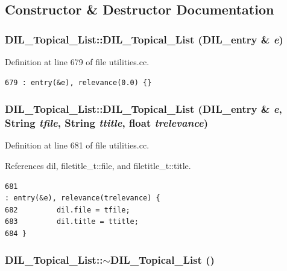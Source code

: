 \subsection{Constructor \& Destructor Documentation}
\subsubsection{\setlength{\rightskip}{0pt plus 5cm}DIL\_\-Topical\_\-List::DIL\_\-Topical\_\-List ({\bf DIL\_\-entry} \& {\em e})}\label{classDIL__Topical__List_a0}




Definition at line 679 of file utilities.cc.



\footnotesize\begin{verbatim}679 : entry(&e), relevance(0.0) {}
\end{verbatim}\normalsize 
{}
\subsubsection{\setlength{\rightskip}{0pt plus 5cm}DIL\_\-Topical\_\-List::DIL\_\-Topical\_\-List ({\bf DIL\_\-entry} \& {\em e}, {\bf String} {\em tfile}, {\bf String} {\em ttitle}, float {\em trelevance})}\label{classDIL__Topical__List_a1}




Definition at line 681 of file utilities.cc.

References dil, filetitle\_\-t::file, and filetitle\_\-t::title.



\footnotesize\begin{verbatim}681                                                                                               : entry(&e), relevance(trelevance) {
682         dil.file = tfile;
683         dil.title = ttitle;
684 }
\end{verbatim}\normalsize 
{}
\subsubsection{\setlength{\rightskip}{0pt plus 5cm}DIL\_\-Topical\_\-List::$\sim$DIL\_\-Topical\_\-List ()\hspace{0.3cm}{\tt  [inline]}}\label{classDIL__Topical__List_a2}




